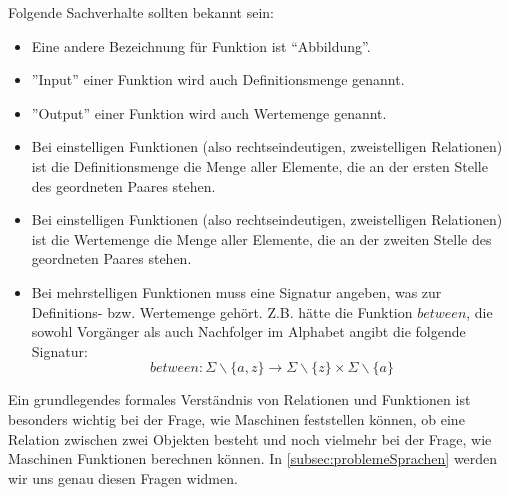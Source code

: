 Folgende Sachverhalte sollten bekannt sein:
\begin{itemize}
    \item Eine andere Bezeichnung für Funktion ist ``Abbildung''.
    \item ''Input'' einer Funktion wird auch Definitionsmenge genannt.
    \item ''Output'' einer Funktion wird auch Wertemenge genannt.
    \item Bei einstelligen Funktionen (also rechtseindeutigen, zweistelligen Relationen)
        ist die Definitionsmenge die Menge aller Elemente,
        die an der ersten Stelle des geordneten Paares stehen.
    \item Bei einstelligen Funktionen (also rechtseindeutigen, zweistelligen Relationen)
        ist die Wertemenge die Menge aller Elemente,
        die an der zweiten Stelle des geordneten Paares stehen.
    \item Bei mehrstelligen Funktionen muss eine Signatur angeben, was zur Definitions-
        bzw. Wertemenge gehört. Z.B. hätte die Funktion $between$,
        die sowohl Vorgänger als auch Nachfolger im Alphabet angibt die folgende Signatur:
        \[ between:
            \Sigma \backslash \{a,z\}
            \rightarrow
            \Sigma \backslash \{z\} \times \Sigma \backslash \{a\} \]
\end{itemize}

Ein grundlegendes formales Verständnis von Relationen und Funktionen ist besonders wichtig
bei der Frage, wie Maschinen feststellen können,
ob eine Relation zwischen zwei Objekten besteht
und noch vielmehr bei der Frage, wie Maschinen Funktionen berechnen können.
In \autoref{subsec:problemeSprachen} werden wir uns genau diesen Fragen widmen.


